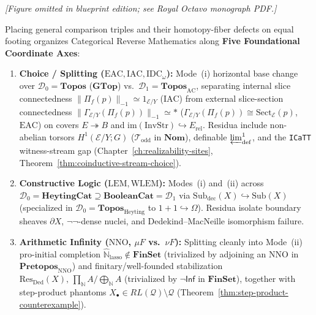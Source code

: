 \begin{center}\emph{[Figure omitted in blueprint edition; see Royal Octavo monograph PDF.]}\label{fig:comparison-triple-residuum}\end{center}

Placing general comparison triples and their homotopy-fiber defects on equal footing organizes Categorical Reverse Mathematics along \textbf{Five Foundational Coordinate Axes}:

\begin{enumerate}
  \item \textbf{Choice / Splitting ($\mathrm{EAC}, \mathrm{IAC}, \mathrm{IDC}_\omega$):} Mode~(i) horizontal base change over $\mathcal{D}_0 = \mathbf{Topos}$ ($\mathbf{GTop}$) vs.\ $\mathcal{D}_1 = \mathbf{Topos}_{\mathrm{AC}}$, separating internal slice connectedness $\|\Pi_f(p)\|_{-1} \simeq 1_{\mathcal{E}/Y}$ ($\mathrm{IAC}$) from external slice-section connectedness $\|\Gamma_{\mathcal{E}/Y}(\Pi_f(p))\|_{-1} \simeq *$ ($\Gamma_{\mathcal{E}/Y}(\Pi_f(p)) \cong \mathrm{Sect}_{\mathcal{E}}(p)$, $\mathrm{EAC}$) on covers $E \twoheadrightarrow B$ and $\mathrm{im}(\mathrm{InvStr}) \hookrightarrow E_{\mathrm{rel}}$. Residua include non-abelian torsors $H^1(\mathcal{E}/Y; G)$ ($\mathcal{T}_{\mathrm{odd}}$ in $\mathbf{Nom}$), definable $\varprojlim^1_{\mathrm{def}}$, and the \texttt{ICaTT} witness-stream gap (Chapter~\ref{ch:realizability-sites}, Theorem~\ref{thm:coinductive-stream-choice}).
  \item \textbf{Constructive Logic ($\mathrm{LEM}, \mathrm{WLEM}$):} Modes~(i) and~(ii) across $\mathcal{D}_0 = \mathbf{HeytingCat} \supseteq \mathbf{BooleanCat} = \mathcal{D}_1$ via $\mathrm{Sub}_{\mathrm{dec}}(X) \hookrightarrow \mathrm{Sub}(X)$ (specialized in $\mathcal{D}_0 = \mathbf{Topos}_{\mathrm{Heyting}}$ to $1+1 \hookrightarrow \Omega$). Residua isolate boundary sheaves $\partial X$, $\neg\neg$-dense nuclei, and Dedekind--MacNeille isomorphism failure.
  \item \textbf{Arithmetic Infinity ($\mathrm{NNO}$, $\mu F$ vs.\ $\nu F$):} Splitting cleanly into Mode~(ii) pro-initial completion $\widehat{\mathbb{N}}_{\mathrm{lasso}} \notin \mathbf{FinSet}$ (trivialized by adjoining an $\mathrm{NNO}$ in $\mathbf{Pretopos}_{\mathrm{NNO}}$) and finitary/well-founded stabilization $\mathrm{Res}_{\mathrm{Ded}}(X),\, \prod_{\mathbb{N}} A / \bigoplus_{\mathbb{N}} A$ (trivialized by $\neg\mathsf{Inf}$ in $\mathbf{FinSet}$), together with step-product phantoms $X_\bullet \in RL(\mathcal{Q}) \setminus \mathcal{Q}$ (Theorem~\ref{thm:step-product-counterexample}).

\end{enumerate}
